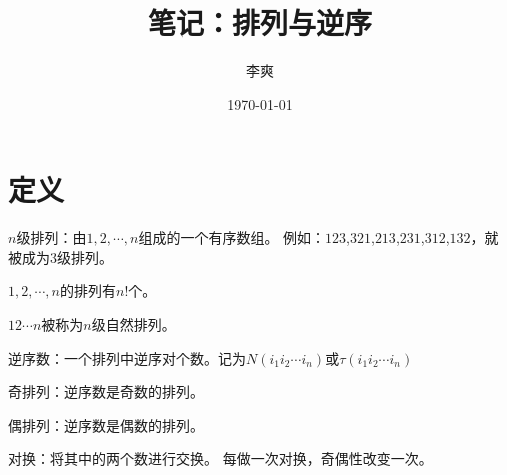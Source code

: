 \documentclass[UTF8, 12pt]{article} %
\title{笔记：排列与逆序}
\author{李爽}
\date{\today}
\begin{document}
\maketitle
\section{定义}
$n$级排列：由$1,2,\cdots,n$组成的一个有序数组。
例如：$123$,$321$,$213$,$231$,$312$,$132$，就被成为3级排列。

$1,2,\cdots,n$的排列有$n!$个。

$12\cdots n$被称为$n$级自然排列。

逆序数：一个排列中逆序对个数。记为$N(i_1 i_2 \cdots i_n)$或$\tau (i_1 i_2 \cdots i_n)$

奇排列：逆序数是奇数的排列。

偶排列：逆序数是偶数的排列。

对换：将其中的两个数进行交换。
每做一次对换，奇偶性改变一次。
\end{document}
